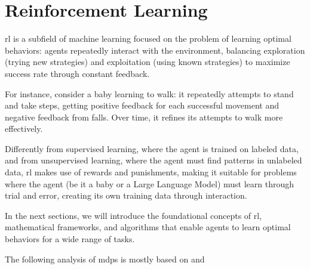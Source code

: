 
\chapter{Reinforcement Learning}

\gls{rl} is a subfield of machine learning focused on the problem of learning 
optimal behaviors: agents repeatedly interact with the environment, balancing 
exploration (trying new strategies) and exploitation (using known strategies) 
to maximize success rate through constant feedback. \

For instance, consider a baby learning to walk: it repeatedly attempts to stand 
and take steps, getting positive feedback for each successful movement and 
negative feedback from falls. Over time, it refines its attempts to walk 
more effectively. \

Differently from supervised learning, where the agent is trained on labeled data, 
and from unsupervised learning, where the agent must find patterns in unlabeled data,
\gls{rl} makes use of rewards and punishments, making it suitable for problems 
where the agent (be it a baby or a Large Language Model) must learn through trial and error, creating its own training data 
through interaction.


% 
% 
% 
% 

% 
% 
% 
% 
% 

In the next sections, we will introduce the foundational concepts of \gls{rl}, 
mathematical frameworks, and algorithms that enable agents to learn optimal behaviors for 
a wide range of tasks.

The following analysis of \glspl{mdp} is mostly based on \citet{d1afac99aad548188c9d47063c7109df} and \citep{Sutton1998}
